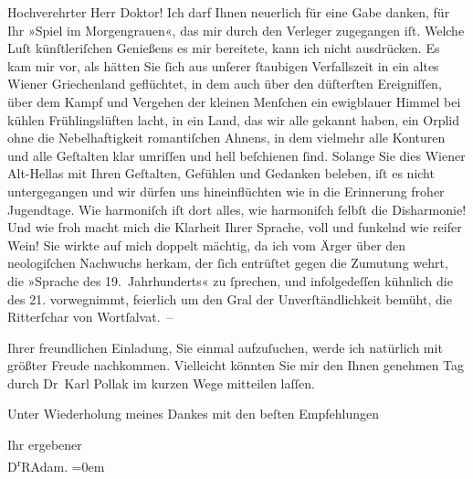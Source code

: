 \pstart\center{}Hochverehrter Herr Doktor!\pend\vspace{0.5em}
\pstart
           Ich darf Ihnen neuerlich für eine Gabe danken, für Ihr »Spiel im Morgengrauen«, das mir durch den Verleger zugegangen iſt. Welche Luſt
               künſtleriſchen Genießens es mir bereitete, kann ich nicht ausdrücken. Es kam mir vor,
               als hätten Sie ſich aus unſerer ſtaubigen Verfallszeit in ein altes Wiener Griechenland
               geflüchtet, in dem auch über den düſterſten Ereigniſſen, über dem Kampf und Vergehen
                  der kleinen Menſchen ein ewigblauer
               Himmel bei kühlen Frühlingslüften lacht, in ein Land, das wir alle gekannt haben, ein
               Orplid ohne die Nebelhaftigkeit romantiſchen Ahnens, in dem vielmehr alle Konturen
               und alle Geſtalten klar umriſſen und hell beſchienen ſind. Solange Sie dies Wiener Alt-Hellas mit Ihren Geſtalten, Gefühlen und Gedanken beleben, iſt es nicht
               untergegangen und wir dürfen uns hineinflüchten wie in die Erinnerung froher
               Jugendtage. Wie harmoniſch iſt dort alles, wie harmoniſch ſelbſt die Disharmonie! Und
               wie froh macht mich die Klarheit Ihrer {\pb}Sprache, voll und funkelnd wie reifer Wein! Sie wirkte auf mich doppelt mächtig, da
               ich vom Ärger über den neologiſchen Nachwuchs herkam, der ſich entrüſtet gegen die
               Zumutung wehrt, die »Sprache des 19. Jahrhunderts« zu ſprechen, und infolgedeſſen
               kühnlich die des 21. vorwegnimmt, feierlich um den Gral der Unverſtändlichkeit
               bemüht, die Ritterſchar von Wortſalvat. –\pend
           
\pstart
           Ihrer freundlichen Einladung, Sie einmal aufzuſuchen, werde ich natürlich mit größter
               Freude nachkommen. Vielleicht könnten Sie mir den Ihnen genehmen Tag durch Dr Karl Pollak im kurzen Wege mitteilen
               laſſen.\pend
           
\pstart
           {\pb}Unter Wiederholung meines Dankes mit den
               beſten Empfehlungen\pend
           
\pstart
           Ihr ergebener{\\[\baselineskip]}\spacefill\mbox{D\textsuperscript{r}RAdam.}\pend
           \leftskip=0em{}\endnumbering{}  
      